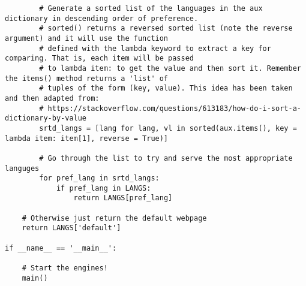 \documentclass[landscape]{article}
\begin{document}
\begin{verbatim}
        # Generate a sorted list of the languages in the aux dictionary in descending order of preference.
        # sorted() returns a reversed sorted list (note the reverse argument) and it will use the function
        # defined with the lambda keyword to extract a key for comparing. That is, each item will be passed
        # to lambda item: to get the value and then sort it. Remember the items() method returns a 'list' of
        # tuples of the form (key, value). This idea has been taken and then adapted from:
        # https://stackoverflow.com/questions/613183/how-do-i-sort-a-dictionary-by-value
        srtd_langs = [lang for lang, vl in sorted(aux.items(), key = lambda item: item[1], reverse = True)]

        # Go through the list to try and serve the most appropriate languges
        for pref_lang in srtd_langs:
            if pref_lang in LANGS:
                return LANGS[pref_lang]

    # Otherwise just return the default webpage
    return LANGS['default']

if __name__ == '__main__':

    # Start the engines!
    main()
            \end{verbatim}
\end{document}
